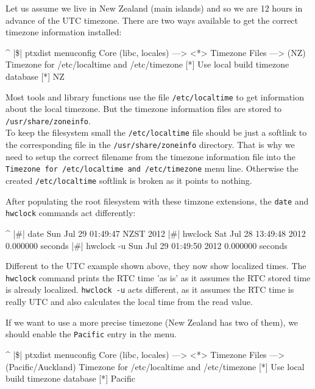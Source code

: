 Let us assume we live in New Zealand (main islands) and so we are 12 hours in
advance of the UTC timezone. There are two ways available to get the correct
timezone information installed:

\begin{ptxshell}[escapechar=|]{^}
|\$| ptxdist menuconfig
  Core (libc, locales) --->
    <*> Timezone Files --->
      (NZ) Timezone for /etc/localtime and /etc/timezone
      [*]   Use local build timezone database
      [*]   NZ
\end{ptxshell}

Most tools and library functions use the file \texttt{/etc/localtime} to
get information about the local timezone. But the timezone information files
are stored to \texttt{/usr/share/zoneinfo}.\\
To keep the filesystem small the \texttt{/etc/localtime} file should be just a
softlink to the corresponding file in the \texttt{/usr/share/zoneinfo}
directory. That is why we need to setup the correct filename from the timezone
information file into the \texttt{Timezone for /etc/localtime and /etc/timezone}
menu line. Otherwise the created \texttt{/etc/localtime} softlink is broken as
it points to nothing.

After populating the root filesystem with these timzone extensions, the
\texttt{date} and \texttt{hwclock} commands act differently:

\begin{ptxshell}[escapechar=|]{^}
|\#| date
Sun Jul 29 01:49:47 NZST 2012
|\#| hwclock
Sat Jul 28 13:49:48 2012  0.000000 seconds
|\#| hwclock -u
Sun Jul 29 01:49:50 2012  0.000000 seconds
\end{ptxshell}

Different to the UTC example shown above, they now show localized times. The
\texttt{hwclock} command prints the RTC time 'as is' as it assumes the RTC
stored time is already localized. \texttt{hwclock -u} acts different, as it
assumes the RTC time is really UTC and also calculates the local time from the
read value.

If we want to use a more precise timezone (New Zealand has two of them), we
should enable the \texttt{Pacific} entry in the \ptxdist{} menu.

\begin{ptxshell}[escapechar=|]{^}
|\$| ptxdist menuconfig
  Core (libc, locales) --->
    <*> Timezone Files --->
      (Pacific/Auckland) Timezone for /etc/localtime and /etc/timezone
      [*]   Use local build timezone database
      [*]   Pacific
\end{ptxshell}

